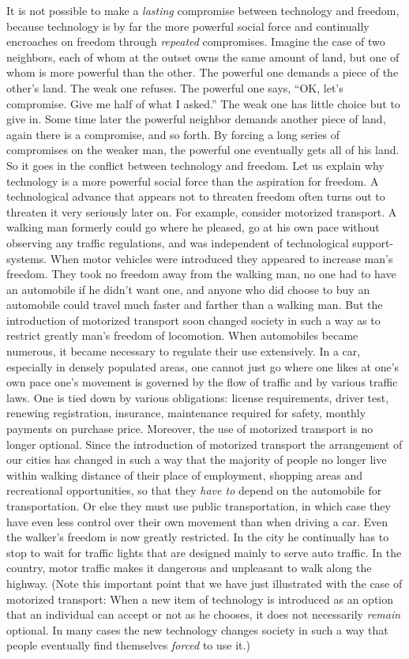  It is not possible to make a {\em lasting} compromise between technology and freedom, because technology is by far the more powerful social force and continually encroaches on freedom through {\em repeated} compromises. Imagine the case of two neighbors, each of whom at the outset owns the same amount of land, but one of whom is more powerful than the other. The powerful one demands a piece of the other’s land. The weak one refuses. The powerful one says, “OK, let’s compromise. Give me half of what I asked.” The weak one has little choice but to give in. Some time later the powerful neighbor demands another piece of land, again there is a compromise, and so forth. By forcing a long series of compromises on the weaker man, the powerful one eventually gets all of his land. So it goes in the conflict between technology and freedom.
 Let us explain why technology is a more powerful social force than the aspiration for freedom.
 A technological advance that appears not to threaten freedom often turns out to threaten it very seriously later on. For example, consider motorized transport. A walking man formerly could go where he pleased, go at his own pace without observing any traffic regulations, and was independent of technological support-systems. When motor vehicles were introduced they appeared to increase man’s freedom. They took no freedom away from the walking man, no one had to have an automobile if he didn’t want one, and anyone who did choose to buy an automobile could travel much faster and farther than a walking man. But the introduction of motorized transport soon changed society in such a way as to restrict greatly man’s freedom of locomotion. When automobiles became numerous, it became necessary to regulate their use extensively. In a car, especially in densely populated areas, one cannot just go where one likes at one’s own pace one’s movement is governed by the flow of traffic and by various traffic laws. One is tied down by various obligations: license requirements, driver test, renewing registration, insurance, maintenance required for safety, monthly payments on purchase price. Moreover, the use of motorized transport is no longer optional. Since the introduction of motorized transport the arrangement of our cities has changed in such a way that the majority of people no longer live within walking distance of their place of employment, shopping areas and recreational opportunities, so that they {\em have to} depend on the automobile for transportation. Or else they must use public transportation, in which case they have even less control over their own movement than when driving a car. Even the walker’s freedom is now greatly restricted. In the city he continually has to stop to wait for traffic lights that are designed mainly to serve auto traffic. In the country, motor traffic makes it dangerous and unpleasant to walk along the highway. (Note this important point that we have just illustrated with the case of motorized transport: When a new item of technology is introduced as an option that an individual can accept or not as he chooses, it does not necessarily {\em remain} optional. In many cases the new technology changes society in such a way that people eventually find themselves {\em forced} to use it.)
